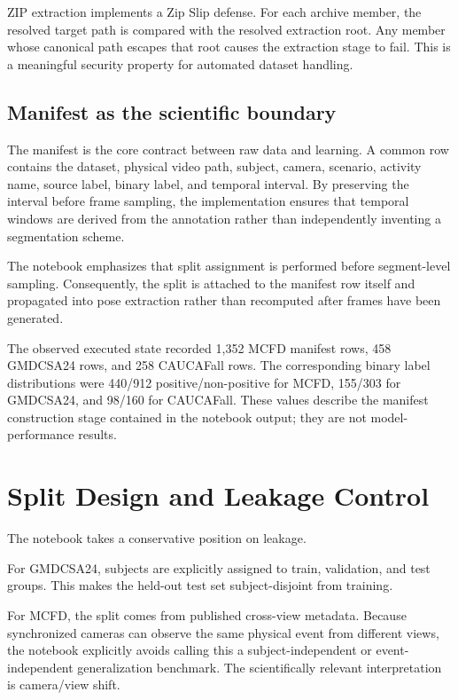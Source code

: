 \documentclass[11pt,a4paper]{article}
\begin{document}
ZIP extraction implements a Zip Slip defense. For each archive member, the resolved target path is compared with the resolved extraction root. Any member whose canonical path escapes that root causes the extraction stage to fail. This is a meaningful security property for automated dataset handling.

\subsection{Manifest as the scientific boundary}

The manifest is the core contract between raw data and learning. A common row contains the dataset, physical video path, subject, camera, scenario, activity name, source label, binary label, and temporal interval. By preserving the interval before frame sampling, the implementation ensures that temporal windows are derived from the annotation rather than independently inventing a segmentation scheme.

The notebook emphasizes that split assignment is performed before segment-level sampling. Consequently, the split is attached to the manifest row itself and propagated into pose extraction rather than recomputed after frames have been generated.

The observed executed state recorded 1,352 MCFD manifest rows, 458 GMDCSA24 rows, and 258 CAUCAFall rows. The corresponding binary label distributions were 440/912 positive/non-positive for MCFD, 155/303 for GMDCSA24, and 98/160 for CAUCAFall. These values describe the manifest construction stage contained in the notebook output; they are not model-performance results.

\section{Split Design and Leakage Control}

The notebook takes a conservative position on leakage.

For GMDCSA24, subjects are explicitly assigned to train, validation, and test groups. This makes the held-out test set subject-disjoint from training.

For MCFD, the split comes from published cross-view metadata. Because synchronized cameras can observe the same physical event from different views, the notebook explicitly avoids calling this a subject-independent or event-independent generalization benchmark. The scientifically relevant interpretation is camera/view shift.
\end{document}

